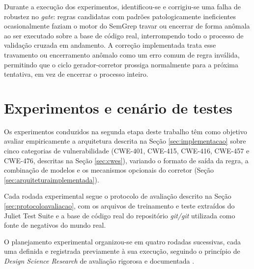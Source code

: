 \documentclass[
    12pt,                %
    openright,           %
    oneside,             %
    a4paper,             %
    english,             %
    brazil               %
]{abntex2}
\begin{document}
\par
Durante a execução dos experimentos, identificou-se e corrigiu-se uma falha de robustez no \textit{gate}: regras candidatas com padrões patologicamente ineficientes ocasionalmente faziam o motor do SemGrep travar ou encerrar de forma anômala ao ser executado sobre a base de código real, interrompendo todo o processo de validação cruzada em andamento.
A correção implementada trata esse travamento ou encerramento anômalo como um erro comum de regra inválida, permitindo que o ciclo gerador-corretor prossiga normalmente para a próxima tentativa, em vez de encerrar o processo inteiro.

\section{Experimentos e cenário de testes}
\label{sec:experimentos}
\par
Os experimentos conduzidos na segunda etapa deste trabalho têm como objetivo avaliar empiricamente a arquitetura descrita na Seção \ref{sec:implementacao} sobre cinco categorias de vulnerabilidade (CWE-401, CWE-415, CWE-416, CWE-457 e CWE-476, descritas na Seção \ref{sec:cwes}), variando o formato de saída da regra, a combinação de modelos e os mecanismos opcionais do corretor (Seção \ref{sec:arquiteturaimplementada}).
\par
Cada rodada experimental segue o protocolo de avaliação descrito na Seção \ref{sec:protocoloavaliacao}, com os arquivos de treinamento e teste extraídos do Juliet Test Suite \cite{nistsard112juliet} e a base de código real do repositório \textit{git/git} utilizada como fonte de negativos do mundo real.
\par
O planejamento experimental organizou-se em quatro rodadas sucessivas, cada uma definida e registrada previamente à sua execução, seguindo o princípio de \textit{Design Science Research} de avaliação rigorosa e documentada \cite{hevner2004design}.
\end{document}
